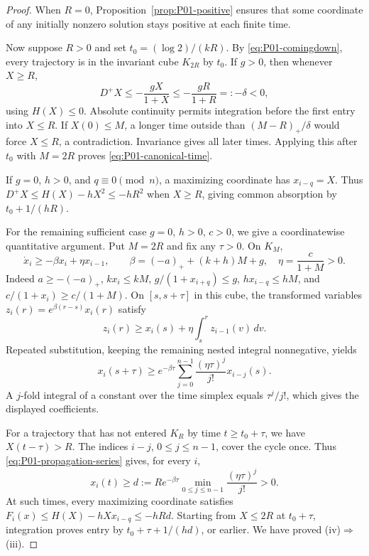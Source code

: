 \begin{proof}
When $R=0$, Proposition~\ref{prop:P01-positive} ensures that some
coordinate of any initially nonzero solution stays positive at each
finite time.

Now suppose $R>0$ and set $t_0=(\log2)/(kR)$. By
\eqref{eq:P01-comingdown}, every trajectory is in the invariant cube
$K_{2R}$ by $t_0$. If $g>0$, then whenever $X\ge R$,
\begin{equation}
\label{eq:P01-strict-gap}
 D^+X\le-\frac{gX}{1+X}\le-\frac{gR}{1+R}=:-\delta<0,
\end{equation}
using $H(X)\le0$. Absolute continuity permits integration before
the first entry into $X\le R$. If $X(0)\le M$, a longer time outside
than $(M-R)_+/\delta$ would force $X\le R$, a contradiction.
Invariance gives all later times. Applying this after $t_0$ with
$M=2R$ proves \eqref{eq:P01-canonical-time}.

If $g=0$, $h>0$, and $q\equiv0\pmod n$, a maximizing coordinate
has $x_{i-q}=X$. Thus $D^+X\le H(X)-hX^2\le-hR^2$ when $X\ge R$,
giving common absorption by $t_0+1/(hR)$.

For the remaining sufficient case $g=0$, $h>0$, $c>0$, we give a
coordinatewise quantitative argument. Put $M=2R$ and fix any
$\tau>0$. On $K_M$,
\begin{equation}
\label{eq:P01-propagation-bound}
 \dot x_i\ge-\beta x_i+\eta x_{i-1},\qquad
 \beta=(-a)_++(k+h)M+g,\quad \eta=\frac{c}{1+M}>0.
\end{equation}
Indeed $a\ge-(-a)_+$, $kx_i\le kM$,
$g/(1+x_{i+q})\le g$, $h x_{i-q}\le hM$, and
$c/(1+x_i)\ge c/(1+M)$. On $[s,s+\tau]$ in this cube, the transformed
variables $z_i(r)=e^{\beta(r-s)}x_i(r)$ satisfy
\[
 z_i(r)\ge x_i(s)+\eta\int_s^r z_{i-1}(v)\,dv.
\]
Repeated substitution, keeping the remaining nested integral
nonnegative, yields
\begin{equation}
\label{eq:P01-propagation-series}
 x_i(s+\tau)\ge e^{-\beta\tau}
       \sum_{j=0}^{n-1}\frac{(\eta\tau)^j}{j!}x_{i-j}(s).
\end{equation}
A $j$-fold integral of a constant over the time simplex equals
$\tau^j/j!$, which gives the displayed coefficients.

For a trajectory that has not entered $K_R$ by time $t\ge t_0+\tau$,
we have $X(t-\tau)>R$. The indices $i-j$, $0\le j\le n-1$, cover
the cycle once. Thus \eqref{eq:P01-propagation-series} gives, for every $i$,
\begin{equation}
\label{eq:P01-positive-floor}
 x_i(t)\ge d:=R e^{-\beta\tau}
        \min_{0\le j\le n-1}\frac{(\eta\tau)^j}{j!}>0.
\end{equation}
At such times, every maximizing coordinate satisfies
$F_i(x)\le H(X)-hXx_{i-q}\le-hRd$.
Starting from $X\le2R$ at $t_0+\tau$, integration proves entry by
$t_0+\tau+1/(hd)$, or earlier. We have proved (iv)$\Rightarrow$(iii).


\end{proof}
